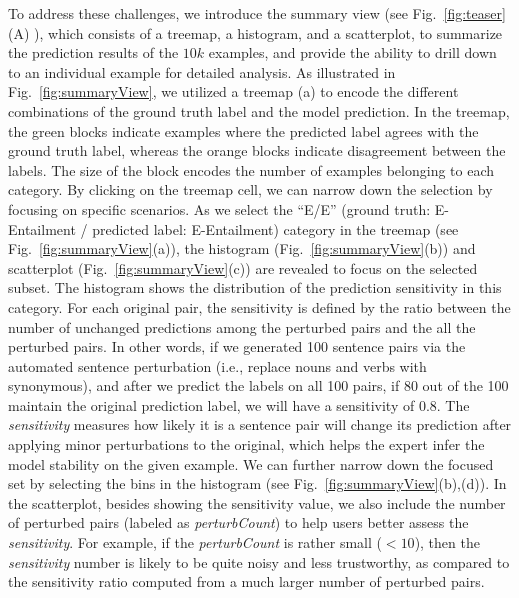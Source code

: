 To address these challenges, we introduce the summary view (see Fig.~\ref{fig:teaser}(A) ), which consists of a treemap, a histogram, and a scatterplot, to summarize the prediction results of the $10k$ examples, and provide the ability to drill down to an individual example for detailed analysis.
As illustrated in Fig.~\ref{fig:summaryView}, we utilized a treemap (a) to encode the different combinations of the ground truth label and the model prediction. In the treemap, the green blocks indicate examples where the predicted label agrees with the ground truth label, whereas the orange blocks indicate disagreement between the labels. The size of the block encodes the number of examples belonging to each category.
%
By clicking on the treemap cell, we can narrow down the selection by focusing on specific scenarios.
%
As we select the ``E/E'' (ground truth: E-Entailment / predicted label: E-Entailment) category in the treemap (see Fig.~\ref{fig:summaryView}(a)), the histogram (Fig.~\ref{fig:summaryView}(b)) and scatterplot  (Fig.~\ref{fig:summaryView}(c)) are revealed to focus on the selected subset. The histogram shows the distribution of the prediction sensitivity in this category. For each original pair, the sensitivity is defined by the ratio between the number of unchanged predictions among the perturbed pairs and the all the perturbed pairs. In other words, if we generated 100 sentence pairs via the automated sentence perturbation (i.e., replace nouns and verbs with synonymous), and after we predict the labels on all 100 pairs, if 80 out of the 100 maintain the original prediction label, we will have a sensitivity of 0.8. The \emph{sensitivity} measures how likely it is a sentence pair will change its prediction after applying minor perturbations to the original, which helps the expert infer the model stability on the given example.
%
We can further narrow down the focused set by selecting the bins in the histogram (see Fig.~\ref{fig:summaryView}(b),(d)).
%
In the scatterplot, besides showing the sensitivity value, we also include the number of perturbed pairs (labeled as \emph{perturbCount}) to help users better assess the \emph{sensitivity}. For example, if the \emph{perturbCount} is rather small ($<10$), then the \emph{sensitivity} number is likely to be quite noisy and less trustworthy, as compared to the sensitivity ratio computed from a much larger number of perturbed pairs.



